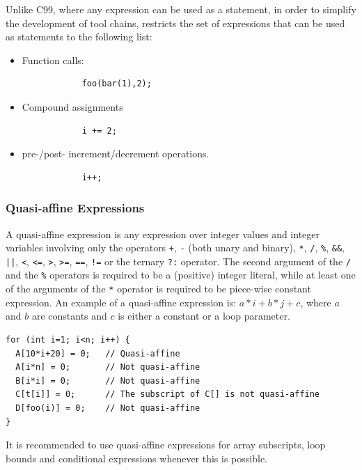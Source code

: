Unlike C99, where any expression can be used as a statement, in
order to simplify the development of \pencil tool chains, \pencil
restricts the set of expressions that can be used as statements
to the following list:
\begin{itemize}
    \item Function calls:
        \begin{lstlisting}
            foo(bar(1),2);
        \end{lstlisting}
    \item Compound assignments
        \begin{lstlisting}
            i += 2;
        \end{lstlisting}
    \item pre-/post- increment/decrement operations.
        \begin{lstlisting}
            i++;
        \end{lstlisting}
\end{itemize}


\subsubsection{Quasi-affine Expressions}
\label{sec:quasi-affine}

A quasi-affine expression is any expression over integer values and
integer variables involving only the operators \lstinline{+},
\lstinline{-} (both unary and binary), \lstinline{*}, \lstinline{/},
\lstinline{%}, \lstinline{&&}, \lstinline{||}, \lstinline{<}, \lstinline{<=},
\lstinline{>}, \lstinline{>=}, \lstinline{==}, \lstinline{!=} or the
ternary \lstinline{?:} operator.  The second argument of the
\lstinline{/} and the \lstinline{%}
operators is required to be a (positive) integer literal, while at
least one of the arguments of the \lstinline{*} operator is
required to be piece-wise constant expression. An example of a
quasi-affine expression is: $a*i+b*j+c$, where $a$ and $b$ are
constants and $c$ is either a constant or a loop parameter.

\begin{lstlisting}[language=pencil]
for (int i=1; i<n; i++) {
  A[10*i+20] = 0;	// Quasi-affine
  A[i*n] = 0;		// Not quasi-affine
  B[i*i] = 0;		// Not quasi-affine
  C[t[i]] = 0;		// The subscript of C[] is not quasi-affine
  D[foo(i)] = 0;	// Not quasi-affine
}
\end{lstlisting}

It is recommended to use quasi-affine expressions for array subscripts,
loop bounds and conditional expressions whenever this is possible.

